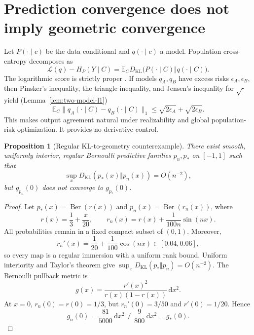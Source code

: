 \documentclass[11pt]{article}
\newtheorem{proposition}[theorem]{Proposition}
\theoremstyle{definition}
\theoremstyle{remark}
\newcommand{\E}{\mathbb{E}}
\newcommand{\KL}{D_{\mathrm{KL}}}
\newcommand{\dd}{\mathrm{d}}
\begin{document}
\section{Prediction convergence does not imply geometric convergence}

Let $P(\cdot\mid c)$ be the data conditional and $q(\cdot\mid c)$ a model. Population cross-entropy decomposes as
\begin{equation}
    \mathcal L(q)-H_P(Y\mid C)
    =\E_C\KL\bigl(P(\cdot\mid C)\Vert q(\cdot\mid C)\bigr).
    \label{eq:ce-decomposition}
\end{equation}
The logarithmic score is strictly proper \citep{gneitingRaftery2007}. If models $q_A,q_B$ have excess risks $\epsilon_A,\epsilon_B$, then Pinsker's inequality, the triangle inequality, and Jensen's inequality for $\sqrt{\cdot}$ yield (Lemma~\ref{lem:two-model-l1})
\begin{equation}
    \E_C\|q_A(\cdot\mid C)-q_B(\cdot\mid C)\|_1
    \le \sqrt{2\epsilon_A}+\sqrt{2\epsilon_B}.
    \label{eq:two-model-pinsker}
\end{equation}
This makes output agreement natural under realizability and global population-risk optimization. It provides no derivative control.

\begin{proposition}[Regular KL-to-geometry counterexample]\label{prop:counterexample}
There exist smooth, uniformly interior, regular Bernoulli predictive families $p_n,p_*$ on $[-1,1]$ such that
\begin{equation}
    \sup_x\KL(p_*(x)\Vert p_n(x))=O(n^{-2}),
\end{equation}
    but $g_{p_n}(0)$ does not converge to $g_{p_*}(0)$.
\end{proposition}

\begin{proof}
Let $p_*(x)=\operatorname{Ber}(r(x))$ and $p_n(x)=\operatorname{Ber}(r_n(x))$, where
\begin{equation}
    r(x)=\frac13+\frac{x}{20},\qquad
    r_n(x)=r(x)+\frac{1}{100n}\sin(nx).
\end{equation}
All probabilities remain in a fixed compact subset of $(0,1)$. Moreover,
\begin{equation}
    r_n'(x)=\frac1{20}+\frac1{100}\cos(nx)\in[0.04,0.06],
\end{equation}
so every map is a regular immersion with a uniform rank bound. Uniform interiority and Taylor's theorem give $\sup_x\KL(p_*\Vert p_n)=O(n^{-2})$. The Bernoulli pullback metric is
\begin{equation}
    g(x)=\frac{r'(x)^2}{r(x)(1-r(x))}\,\dd x^2.
\end{equation}
At $x=0$, $r_n(0)=r(0)=1/3$, but $r_n'(0)=3/50$ and $r'(0)=1/20$. Hence
\begin{equation}
    g_n(0)=\frac{81}{5000}\,\dd x^2
    \neq \frac9{800}\,\dd x^2=g_*(0).
\end{equation}
\end{proof}
\end{document}
